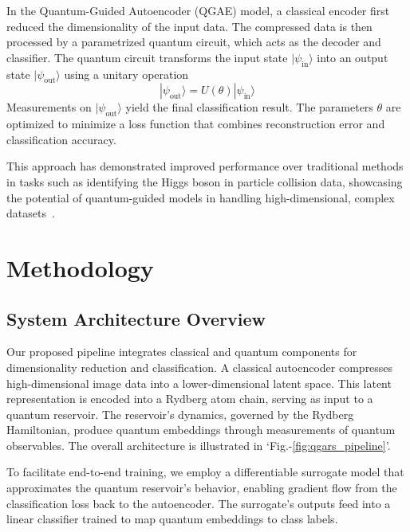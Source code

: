 \documentclass[conference]{IEEEtran}
\begin{document}
In the Quantum-Guided Autoencoder (QGAE) model, a 
classical encoder first reduced the dimensionality
of the input data. The compressed data is then processed 
by a parametrized quantum circuit, which acts as the decoder
and classifier. The quantum circuit transforms the 
input state \( |\psi_{\text{in}}\rangle \) into an
output state \( |\psi_{\text{out}}\rangle \) using a unitary operation
\begin{equation}
    |\psi_{\text{out}}\rangle = U(\theta) |\psi_{\text{in}}\rangle
\end{equation}
Measurements on \( |\psi_{\text{out}}\rangle \) yield the final
classification result. The parameters \( \theta \) are
optimized to minimize a loss function that combines
reconstruction error and classification accuracy.


This approach has demonstrated improved performance 
over traditional methods in tasks such as identifying 
the Higgs boson in particle collision data, 
showcasing the potential of quantum-guided models in 
handling high-dimensional, complex datasets~\cite{belisGuidedQuantumCompression2024}.

\section{Methodology}
\subsection{System Architecture Overview}

Our proposed pipeline integrates classical and quantum 
components for dimensionality reduction and classification. 
A classical autoencoder compresses high-dimensional image 
data into a lower-dimensional latent space. This latent 
representation is encoded into a Rydberg atom chain, 
serving as input to a quantum reservoir. The reservoir's 
dynamics, governed by the Rydberg Hamiltonian, produce 
quantum embeddings through measurements of quantum observables.
The overall architecture is illustrated in `Fig.-\ref{fig:qgars_pipeline}'.

To facilitate end-to-end training, we employ a differentiable 
surrogate model that approximates the quantum reservoir's 
behavior, enabling gradient flow from the classification 
loss back to the autoencoder. The surrogate's outputs feed 
into a linear classifier trained to map quantum embeddings to class labels.
\end{document}
